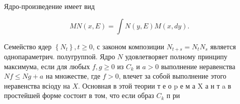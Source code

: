 \documentclass[10pt]{article}
\begin{document}
Ядро-произведение имеет вид



\[

M N(x, E)=\int N(y, E) M(x, d y) .

\]



Семейство ядер $\left\{N_{t}\right\}, t \geqslant 0$, с законом композиции $N_{t+s}=N_{t} N_{s}$ является однопараметрич. полугруппой. Ядро $N$ удовлетворяет полному принципу максимума, если для любых $f, g \geqslant 0$ из $C_{k}$ и $a>0$ выполнение неравенства $N f \leqslant N g+a$ на множестве, где $f>0$, влечет за собой выполнение этого неравенства всіоду на $X$. Основная в этой теории т е о $\mathrm{p}$ е м а X а н т a в простейшей форме состоит в том, что если образ $C_{k}$ п ри
\end{document}
